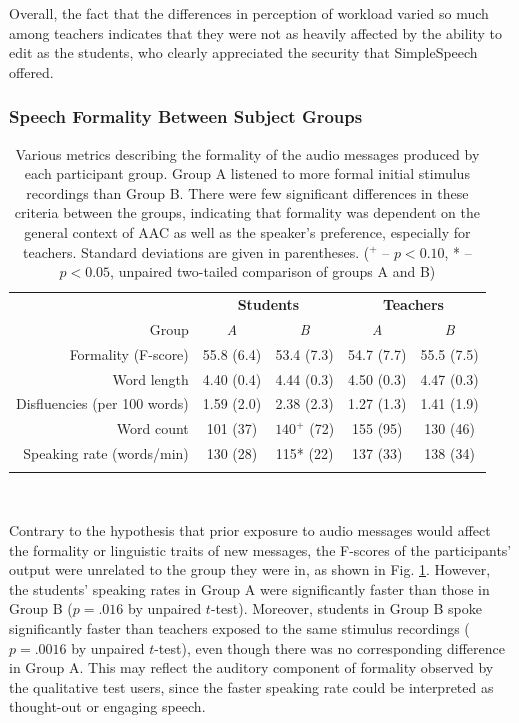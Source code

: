 Overall, the fact that the differences in perception of workload varied so much among teachers indicates that they were not as heavily affected by the ability to edit as the students, who clearly appreciated the security that SimpleSpeech offered.

\subsubsection{Speech Formality Between Subject Groups}
\begin{table}
	\centering
	\begin{tabular}{r c c c c}
		\toprule
		& \multicolumn{2}{c}{\textbf{Students}} & \multicolumn{2}{c}{\textbf{Teachers}} \\
		Group                        & \textit{A} & \textit{B}  & \textit{A} & \textit{B} \\
		Formality (F-score)          & 55.8 (6.4)   & 53.4 (7.3)         & 54.7 (7.7)   & 55.5 (7.5)\\
		Word length                  & 4.40 (0.4)   & 4.44 (0.3)           & 4.50 (0.3)    & 4.47 (0.3)\\
		Disfluencies (per 100 words) & 1.59 (2.0)    & 2.38 (2.3)          & 1.27 (1.3)    & 1.41 (1.9)\\
		Word count                   & 101 (37)  & $140^+$ (72)      & 155 (95)  & 130 (46)\\
		Speaking rate (words/min)    & 130 (28)  & 115* (22)      & 137 (33)  & 138 (34)\\
		\bottomrule \\
	\end{tabular}
	\caption{Various metrics describing the formality of the audio messages produced by each participant group. Group A listened to more formal initial stimulus recordings than Group B. There were few significant differences in these criteria between the groups, indicating that formality was dependent on the general context of AAC as well as the speaker's preference, especially for teachers. Standard deviations are given in parentheses. ($^+$ -- $p<0.10$, * -- $p<0.05$, unpaired two-tailed comparison of groups A and B)}~\label{tab:formality}
\end{table}

Contrary to the hypothesis that prior exposure to audio messages would affect the formality or linguistic traits of new messages, the F-scores of the participants' output were unrelated to the group they were in, as shown in Fig. \ref{tab:formality}.
However, the students' speaking rates in Group A were significantly faster than those in Group B ($p=.016$ by unpaired $t$-test).
Moreover, students in Group B spoke significantly faster than teachers exposed to the same stimulus recordings ($p=.0016$ by unpaired $t$-test), even though there was no corresponding difference in Group A.
This may reflect the auditory component of formality observed by the qualitative test users, since the faster speaking rate could be interpreted as thought-out or engaging speech.

